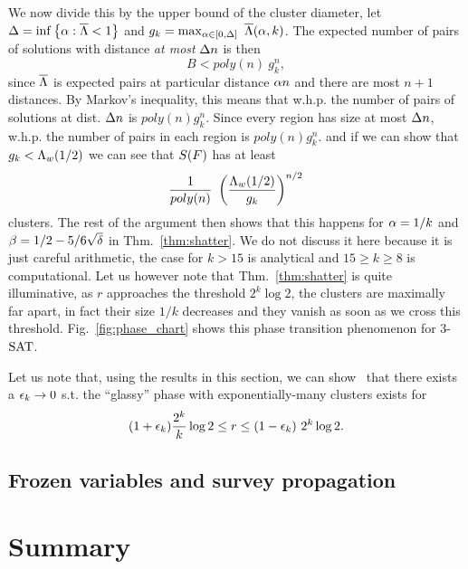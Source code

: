 \documentclass[letterpaper, 10pt, twocolumn, reqno]{amsart}
\begin{document}
We now divide this by the upper bound of the cluster diameter, let $\D = \inf \cbrac{\a: \bL < 1}$ and $g_k = \max_{\a \in [0,\D]}\ \bL(\a,k)$. The expected
number of pairs of solutions with distance \emph{at most} $\D n$ is then
$$B < poly(n)\ g_k^n,$$
since $\bL$ is expected pairs at particular distance $\a n$
and there are most $n+1$ distances. By Markov's inequality, this means that w.h.p. the number of pairs of solutions at dist. $\D n$ is $poly(n) g_k^n$. Since
every region has size at most $\D n$, w.h.p. the number of pairs in each region is $poly(n) g_k^n$. and if we can show that $g_k < \L_w(1/2)$ we can
see that $\sf$ has at least
$$
\f{1}{poly(n)}\ \rbrac{\f{\L_w(1/2)}{g_k}}^{n/2}
$$
clusters. The rest of the argument then shows that this happens for $\a = 1/k$ and $\b = 1/2 - 5/6\sqrt{\d}$ in Thm.~\ref{thm:shatter}. We do not discuss it here because it is just careful arithmetic, the case for $k > 15$ is analytical and $15 \geq k \geq 8$ is computational. Let us however note that Thm.~\ref{thm:shatter} is quite illuminative, as $r$ approaches the threshold $2^k \log 2$, the clusters are maximally far apart, in fact their size $1/k$ decreases and they vanish as soon as we cross this threshold. Fig.~\ref{fig:phase_chart} shows this phase transition phenomenon for 3-$\SAT$.

Let us note that, using the results in this section, we can show~\cite{achlioptas2008algorithmic} that there exists a $\e_k \to 0$ s.t. the ``glassy'' phase with exponentially-many clusters exists for
$$
(1 +\e_k) \f{2^k}{k} \log 2 \leq r \leq (1-\e_k)\ 2^k \log 2.
$$


\subsection{Frozen variables and survey propagation}
\label{ssec:frozen_variables}


\section{Summary}
\label{sec:summary}


{
\small


}
\end{document}
